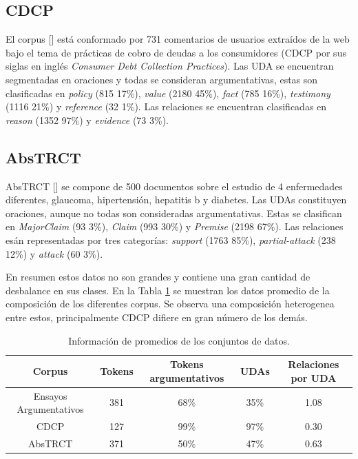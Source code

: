 \subsection{CDCP}\label{corpus:cdcp}

El corpus [\cite{niculae2017argument}] está conformado por 731 comentarios de usuarios extraídos de la web bajo el tema de 
prácticas de cobro de deudas a los consumidores (CDCP por sus siglas en inglés \emph{Consumer Debt Collection Practices}).
Las UDA se encuentran segmentadas en oraciones y todas se consideran argumentativas, estas son clasificadas en 
\emph{policy} (815 17\%), \emph{value} (2180 45\%), \emph{fact} (785 16\%), \emph{testimony} (1116 21\%) y \emph{reference} (32 1\%). 
Las relaciones se encuentran clasificadas en \emph{reason} (1352 97\%) y \emph{evidence} (73 3\%).

\subsection{AbsTRCT}

AbsTRCT [\cite{mayer2020transformer}] se compone de 500 documentos sobre el estudio de 4 enfermedades diferentes,
glaucoma, hipertensión, hepatitis b y diabetes. Las UDAs constituyen oraciones, aunque no todas son consideradas
argumentativas. Estas se clasifican en \emph{MajorClaim} (93 3\%), \emph{Claim} (993 30\%) y \emph{Premise} (2198 67\%).
Las relaciones esán representadas por tres categorías: \emph{support} (1763 85\%), \emph{partial-attack} (238 12\%) y
\emph{attack} (60 3\%).

En resumen estos datos no son grandes y contiene una gran cantidad de desbalance en sus clases.
En la Tabla \ref{table:corpus_info} se muestran los datos promedio de la composición de los diferentes corpus. 
Se observa una composición heterogenea entre estos, principalmente CDCP difiere en gran número de los demás.

\begin{table}[h!]
	\begin{center}
		\begin{tabular}{|c|c|c|c|c|} \hline
		Corpus		            & Tokens 	& Tokens argumentativos	& UDAs   & Relaciones por UDA    \\ \hline
		Ensayos Argumentativos  & 381		& 68\% 					& 35\% 	 & 1.08					 \\ \hline
		CDCP		            & 127		& 99\% 					& 97\% 	 & 0.30					 \\ \hline
		AbsTRCT	                & 371		& 50\% 					& 47\% 	 & 0.63					 \\ \hline
		\end{tabular}
	\caption{Información de promedios de los conjuntos de datos.}\label{table:corpus_info}
	\end{center}
\end{table}

